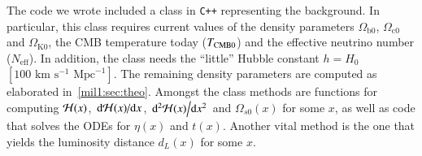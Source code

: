 


The code we wrote included a class in \verb|C++| representing the background. In particular, this class requires current values of the density parameters $\Omega_{\mathrm{b}0}$, $\Omega_{\mathrm{c}0}$ and $\Omega_{\mathrm{K}0}$, the CMB temperature today ($T_{\mathrm{CMB}0}$) and the effective neutrino number ($N_\mathrm{eff}$). In addition, the class needs the ``little'' Hubble constant $h=H_0$~$[100\text{~km}\text{~s}^{-1}\text{~Mpc}^{-1}]$. The remaining density parameters are computed as elaborated in~\cref{mil1:sec:theo}. Amongst the class methods are functions for computing $\mathcal{H}(x)$, $\dv*{\mathcal{H}(x)}{x}$, $\dv*[2]{\mathcal{H}(x)}{x}$ and $\Omega_{s0}(x)$ for some $x$, as well as code that solves the ODEs for $\eta(x)$ and $t(x)$. Another vital method is the one that yields the luminosity distance $d_L(x)$ for some $x$.


